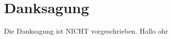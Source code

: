 \chapter*{Danksagung}
\thispagestyle{plain}
\pagestyle{plain}

Die Danksagung ist NICHT vorgeschrieben.
Hallo ohr

\newpage